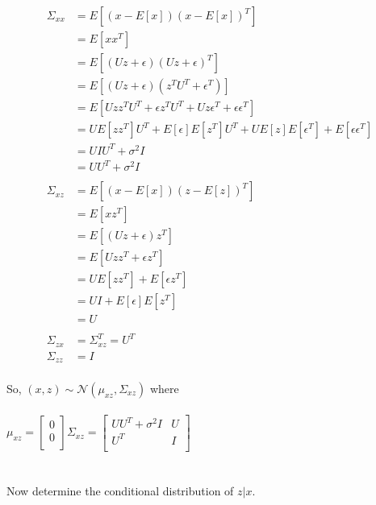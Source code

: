 \documentclass[11pt]{article}
\begin{document}
\begin{align*}
    \Sigma_{xx} &= E[(x-E[x])(x-E[x])^T]  \\
                &= E[xx^T] \\
                &= E[(Uz + \epsilon)(Uz + \epsilon)^T] \\
                &= E[(Uz + \epsilon)(z^T U^T + \epsilon^T)] \\
                &= E[Uzz^TU^T + \epsilon z^TU^T + Uz\epsilon^T + \epsilon\epsilon^T] \\
                &= UE[zz^T]U^T + E[\epsilon] E[z^T] U^T + U E[z] E[\epsilon^T] + E[\epsilon\epsilon^T] \\
                &= UIU^T + \sigma^2 I \\
                &= UU^T + \sigma^2 I \\
                \\
    \Sigma_{xz} &= E[(x-E[x])(z - E[z])^T] \\
                &= E[xz^T] \\
                &= E[(Uz + \epsilon)z^T] \\
                &= E[Uzz^T + \epsilon z^T] \\
                &= U E[zz^T] + E[\epsilon z^T] \\
                &= UI + E[\epsilon]E[z^T] \\
                &= U \\
                \\
    \Sigma_{zx} &= \Sigma_{xz}^T = U^T
                \\
    \Sigma_{zz} &= I \\
\end{align*}

So,
$(x,z) \sim \mathcal{N}(\mu_{xz},\Sigma_{xz})$ where \\\\
$
\mu_{xz} = 
\begin{bmatrix}
    0 \\
    0 \\
\end{bmatrix}
\Sigma_{xz} = 
\begin{bmatrix}
    UU^T + \sigma^2 I & U \\
    U^T               & I \\
\end{bmatrix}
$
\\\\\\
Now determine the conditional distribution of $z|x$.\\
\end{document}
